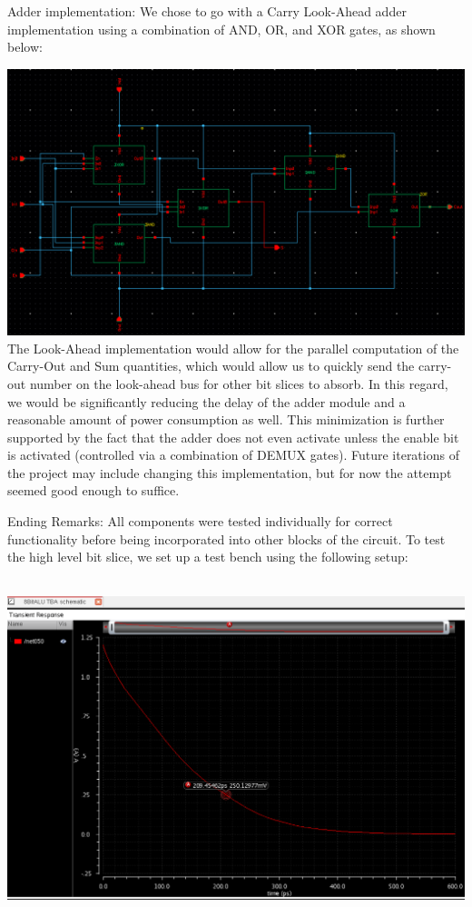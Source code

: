 \documentclass[12pt]{article}
\begin{document}
	Adder implementation:
	We chose to go with a Carry Look-Ahead adder implementation using a combination of AND,
	OR, and XOR gates, as shown below:
	
  \includegraphics[scale=0.4]{add.png}
  \\

	
	The Look-Ahead implementation would allow for the parallel computation of the Carry-Out and
	Sum quantities, which would allow us to quickly send the carry-out number on the look-ahead
	bus for other bit slices to absorb. In this regard, we would be significantly reducing the delay
	of the adder module and a reasonable amount of power consumption as well. This minimization
	is further supported by the fact that the adder does not even activate unless the enable bit
	is activated (controlled via a combination of DEMUX gates). Future iterations of the project 
	may include changing this implementation, but for now the attempt seemed good enough to
	suffice.
	
	Ending Remarks:
	All components were tested individually for correct functionality before being incorporated 
	into other blocks of the circuit. To test the high level bit slice, we set up a test bench using
	the following setup:
	
  \\
  \includegraphics[scale=0.4]{AndDelay.png}
  \\
\end{document}
